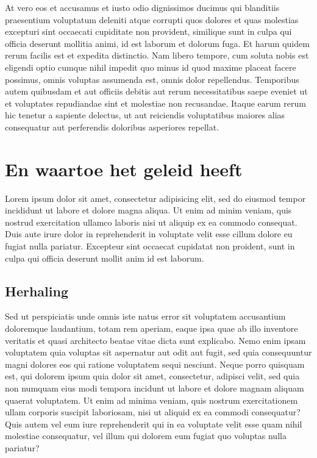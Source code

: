 \documentclass[a4paper,11pt,oneside,openright,english,copyright]{kdgcoursetext}
\begin{document}
At vero eos et accusamus et iusto odio dignissimos ducimus qui
blanditiis praesentium voluptatum deleniti atque corrupti quos dolores
et quas molestias excepturi sint occaecati cupiditate non provident,
similique sunt in culpa qui officia deserunt mollitia animi, id est
laborum et dolorum fuga. Et harum quidem rerum facilis est et expedita
distinctio. Nam libero tempore, cum soluta nobis est eligendi optio
cumque nihil impedit quo minus id quod maxime placeat facere possimus,
omnis voluptas assumenda est, omnis dolor repellendus. Temporibus
autem quibusdam et aut officiis debitis aut rerum necessitatibus saepe
eveniet ut et voluptates repudiandae sint et molestiae non
recusandae. Itaque earum rerum hic tenetur a sapiente delectus, ut aut
reiciendis voluptatibus maiores alias consequatur aut perferendis
doloribus asperiores repellat.

\section{En waartoe het geleid heeft}

Lorem ipsum dolor sit amet, consectetur adipisicing elit, sed do
eiusmod tempor incididunt ut labore et dolore magna aliqua. Ut enim ad
minim veniam, quis nostrud exercitation ullamco laboris nisi ut
aliquip ex ea commodo consequat. Duis aute irure dolor in
reprehenderit in voluptate velit esse cillum dolore eu fugiat nulla
pariatur. Excepteur sint occaecat cupidatat non proident, sunt in
culpa qui officia deserunt mollit anim id est laborum.

\subsection{Herhaling}
Sed ut perspiciatis unde omnis iste natus error sit voluptatem
accusantium doloremque laudantium, totam rem aperiam, eaque ipsa quae
ab illo inventore veritatis et quasi architecto beatae vitae dicta
sunt explicabo. Nemo enim ipsam voluptatem quia voluptas sit
aspernatur aut odit aut fugit, sed quia consequuntur magni dolores eos
qui ratione voluptatem sequi nesciunt. Neque porro quisquam est, qui
dolorem ipsum quia dolor sit amet, consectetur, adipisci velit, sed
quia non numquam eius modi tempora incidunt ut labore et dolore magnam
aliquam quaerat voluptatem. Ut enim ad minima veniam, quis nostrum
exercitationem ullam corporis suscipit laboriosam, nisi ut aliquid ex
ea commodi consequatur? Quis autem vel eum iure reprehenderit qui in
ea voluptate velit esse quam nihil molestiae consequatur, vel illum
qui dolorem eum fugiat quo voluptas nulla pariatur?
\end{document}
